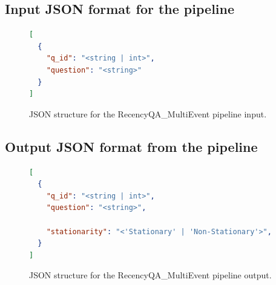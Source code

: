 \subsection{Input JSON format for the pipeline}
\label{app:sec:input-json}
\begin{figure}[h]
\begin{lstlisting}[language=JSON]
[
  {
    "q_id": "<string | int>",
    "question": "<string>"
  }
]
\end{lstlisting}
\caption{JSON structure for the RecencyQA\_MultiEvent pipeline input.}
\end{figure}

\subsection{Output JSON format from the pipeline}
\label{app:sec:output-json}
\begin{figure}[h]
\begin{lstlisting}[language=JSON]
[
  {
    "q_id": "<string | int>",
    "question": "<string>",   

    "stationarity": "<'Stationary' | 'Non-Stationary'>",
  }
]
\end{lstlisting}
\caption{JSON structure for the RecencyQA\_MultiEvent pipeline output.}
\end{figure}
